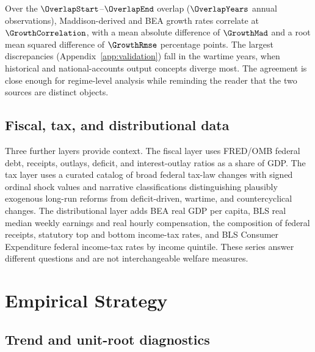 \documentclass[11pt]{article}
\begin{document}
Over the $\OverlapStart$--$\OverlapEnd$ overlap ($\OverlapYears$ annual
observations), Maddison-derived and BEA growth rates correlate at
$\GrowthCorrelation$, with a mean absolute difference of $\GrowthMad$ and a root
mean squared difference of $\GrowthRmse$ percentage points. The largest
discrepancies (Appendix~\ref{app:validation}) fall in the wartime years, when
historical and national-accounts output concepts diverge most. The agreement is
close enough for regime-level analysis while reminding the reader that the two
sources are distinct objects.

\subsection{Fiscal, tax, and distributional data}

Three further layers provide context. The fiscal layer uses FRED/OMB federal
debt, receipts, outlays, deficit, and interest-outlay ratios as a share of GDP.
The tax layer uses a curated catalog of broad federal tax-law changes with signed
ordinal shock values and narrative classifications distinguishing plausibly
exogenous long-run reforms from deficit-driven, wartime, and countercyclical
changes. The distributional layer adds BEA real GDP per capita, BLS real median
weekly earnings and real hourly compensation, the composition of federal
receipts, statutory top and bottom income-tax rates, and BLS Consumer Expenditure
federal income-tax rates by income quintile. These series answer different
questions and are not interchangeable welfare measures.

\section{Empirical Strategy}
\label{sec:methods}

\subsection{Trend and unit-root diagnostics}
\end{document}
